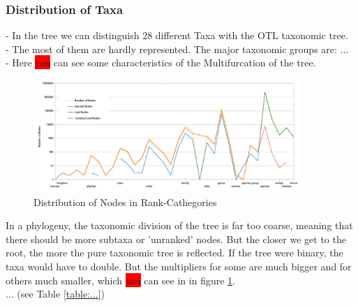     \subsubsection{Distribution of Taxa}
    - In the tree we can distinguish 28 different Taxa with the OTL taxonomic tree. \\
    - The most of them are hardly represented. The major taxonomic groups are: ... \\
    - Here \colorbox{red}{you} can see some characteristics of the Multifurcation of the tree. \\
    \begin{figure}[h!]
      \centering
      \includegraphics[width=0.9\textwidth]{Figures/TaxaTable2.JPG}
      \caption{Distribution of Nodes in Rank-Cathegories}
      \label{fig:taxaTable2}
    \end{figure}
    In a phylogeny, the taxonomic division of the tree is far too coarse, meaning that there should 
      be more subtaxa or 'unranked' nodes. But the closer we get to the root, the more the pure
      taxonomic tree is reflected. If the tree were binary, the taxa would have to double. But the 
      multipliers for some are much bigger and for others much smaller, which \colorbox{red}{you} can see in in figure 
      \ref{fig:taxaTable2}. \\
      ... (see Table \ref{table:...})
    
